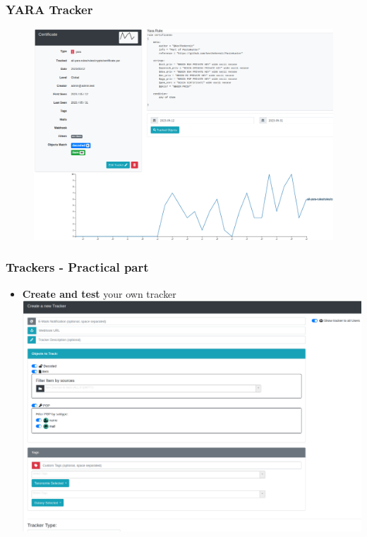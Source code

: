 \documentclass{beamer}
\begin{document}
\begin{frame}
    \frametitle{YARA Tracker}
        \begin{figure}
            \includegraphics[scale=0.22]{screenshot/tracker_yara.png}
        \end{figure}
\end{frame}

\begin{frame}
    \frametitle{Trackers - Practical part}
        \begin{itemize}
        	\item \textbf{Create and test} your own tracker
        	\includegraphics[scale=0.21]{screenshot/tracker_create.png}
        \end{itemize}
\end{frame}
\end{document}
